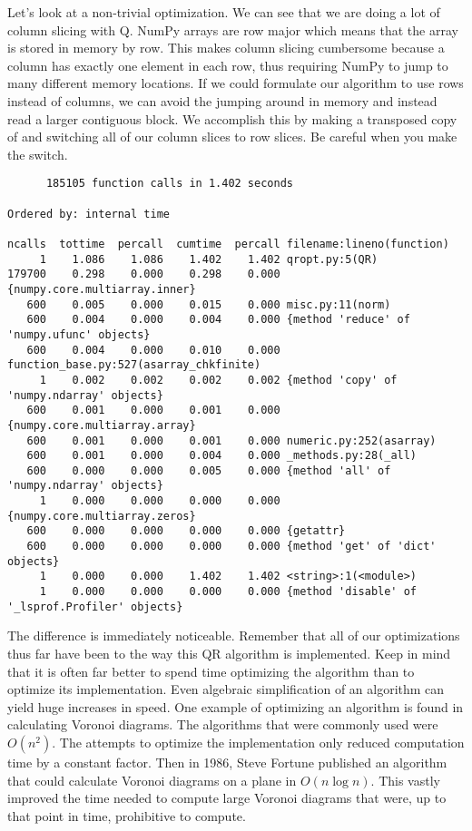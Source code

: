 Let's look at a non-trivial optimization.  We can see that we are doing a lot of column slicing with Q.
NumPy arrays are row major which means that the array is stored in memory by row.
This makes column slicing cumbersome because a column has exactly one element in each row, thus requiring NumPy
to jump to many different memory locations.  If we could formulate our algorithm to use rows instead of columns,
we can avoid the jumping around in memory and instead read a larger contiguous block.
We accomplish this by making  a transposed copy of  and switching all of our column slices to row slices.
Be careful when you make the switch.
{\scriptsize
\begin{verbatim}
      185105 function calls in 1.402 seconds

Ordered by: internal time

ncalls  tottime  percall  cumtime  percall filename:lineno(function)
     1    1.086    1.086    1.402    1.402 qropt.py:5(QR)
179700    0.298    0.000    0.298    0.000 {numpy.core.multiarray.inner}
   600    0.005    0.000    0.015    0.000 misc.py:11(norm)
   600    0.004    0.000    0.004    0.000 {method 'reduce' of 'numpy.ufunc' objects}
   600    0.004    0.000    0.010    0.000 function_base.py:527(asarray_chkfinite)
     1    0.002    0.002    0.002    0.002 {method 'copy' of 'numpy.ndarray' objects}
   600    0.001    0.000    0.001    0.000 {numpy.core.multiarray.array}
   600    0.001    0.000    0.001    0.000 numeric.py:252(asarray)
   600    0.001    0.000    0.004    0.000 _methods.py:28(_all)
   600    0.000    0.000    0.005    0.000 {method 'all' of 'numpy.ndarray' objects}
     1    0.000    0.000    0.000    0.000 {numpy.core.multiarray.zeros}
   600    0.000    0.000    0.000    0.000 {getattr}
   600    0.000    0.000    0.000    0.000 {method 'get' of 'dict' objects}
     1    0.000    0.000    1.402    1.402 <string>:1(<module>)
     1    0.000    0.000    0.000    0.000 {method 'disable' of '_lsprof.Profiler' objects}
\end{verbatim}
}
The difference is immediately noticeable.  Remember that all of our optimizations thus far have been
to the way this QR algorithm is implemented.  Keep in mind that it is often far better to spend time optimizing the algorithm
than to optimize its implementation.  Even algebraic simplification of an algorithm can yield huge increases in speed.
One example of optimizing an algorithm is found in calculating Voronoi diagrams.  The algorithms that were commonly used were $O(n^2)$.
The attempts to optimize the implementation only reduced computation time by a constant factor.
Then in 1986, Steve Fortune published an algorithm that could calculate Voronoi diagrams on a plane in $O(n \log n)$.
This vastly improved the time needed to compute large Voronoi diagrams that were, up to that point in time, prohibitive to compute.


